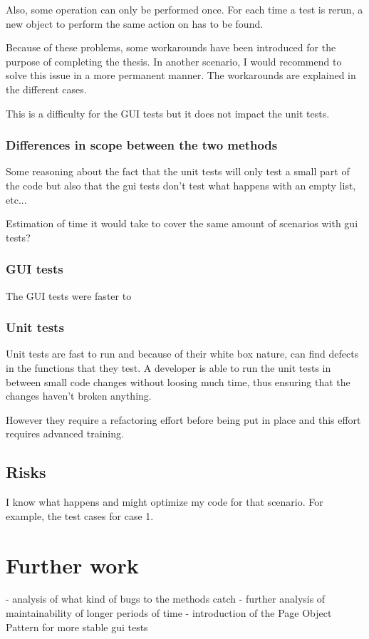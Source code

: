 \documentclass{article}
\begin{document}
			Also, some operation can only be performed once. For each time a test is rerun, a new object to perform the same action on has to be found.

			Because of these problems, some workarounds have been introduced for the purpose of completing the thesis. In another scenario, I would recommend to solve this issue in a more permanent manner. The workarounds are explained in the different cases.

			This is a difficulty for the GUI tests but it does not impact the unit tests.

			\subsubsection{Differences in scope between the two methods}
			Some reasoning about the fact that the unit tests will only test a small part of the code but also that the gui tests don't test what happens with an empty list, etc...

			Estimation of time it would take to cover the same amount of scenarios with gui tests?

			\subsubsection{GUI tests}
			The GUI tests were faster to 

			\subsubsection{Unit tests}
			Unit tests are fast to run and because of their white box nature, can find defects in the functions that they test. A developer is able to run the unit tests in between small code changes without loosing much time, thus ensuring that the changes haven't broken anything. 

			However they require a refactoring effort before being put in place and this effort requires advanced training. 

		\subsection{Risks}
		I know what happens and might optimize my code for that scenario. For example, the test cases for case 1. 

	\section{Further work}
	- analysis of what kind of bugs to the methods catch
	- further analysis of maintainability of longer periods of time 
	- introduction of the Page Object Pattern for more stable gui tests
\end{document}
